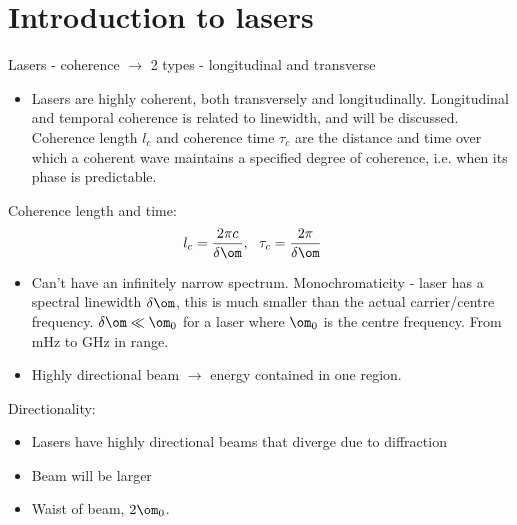 \documentclass[a4paper, 11pt, normalem]{report}
\begin{document}
\section{Introduction to lasers}
Lasers - coherence $\to$ 2 types - longitudinal and transverse
\begin{itemize}
    \item Lasers are highly coherent, both transversely and longitudinally.
        Longitudinal and temporal coherence is related to linewidth, and will be discussed.
        Coherence length $l_c$ and coherence time $\tau_c$ are the distance and time over which a coherent wave maintains a specified degree of coherence, i.e. when its phase is predictable.
\end{itemize}
\begin{multicols}{2}
\begin{figure}[H]
    \centering
\end{figure}
\columnbreak
Coherence length and time:
\begin{align}
    l_c &= \frac{2\pi c}{\delta\om},~~  \tau_c = \frac{2\pi}{\delta\om}
\end{align}
\end{multicols}
\begin{itemize}
    \item Can't have an infinitely narrow spectrum.
        Monochromaticity - laser has a spectral linewidth $\delta\om$, this is much smaller than the actual carrier/centre frequency. $\delta\om\ll\om_0$ for a laser where $\om_0$ is the centre frequency.
        From mHz to GHz in range.
    \item Highly directional beam $\to$ energy contained in one region.
\end{itemize}
Directionality:
\begin{itemize}
    \item Lasers have highly directional beams that diverge due to diffraction
    \item Beam will be larger
    \item Waist of beam, $2\om_0$.
\end{itemize}
\end{document}
